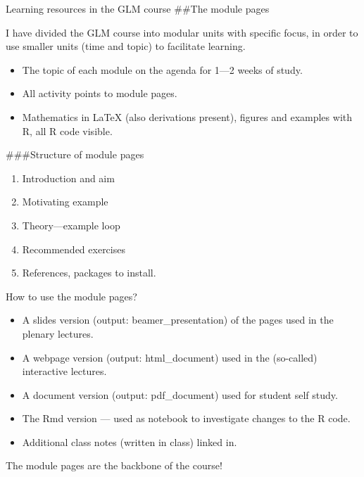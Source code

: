 \documentclass[
  ignorenonframetext,
]{beamer}
\providecommand{\tightlist}{%
  \setlength{\itemsep}{0pt}\setlength{\parskip}{0pt}}
\begin{document}
\begin{frame}{Learning resources in the GLM course}
\protect\hypertarget{learning-resources-in-the-glm-course}{}
\#\#The module pages

I have divided the GLM course into modular units with specific focus, in
order to use smaller units (time and topic) to facilitate learning.

\begin{itemize}
\tightlist
\item
  The topic of each module on the agenda for 1---2 weeks of study.
\item
  All activity points to module pages.
\item
  Mathematics in LaTeX (also derivations present), figures and examples
  with R, all R code visible.
\end{itemize}
\end{frame}

\begin{frame}
\#\#\#Structure of module pages

\begin{enumerate}
[1)]
\tightlist
\item
  Introduction and aim
\item
  Motivating example
\item
  Theory---example loop
\item
  Recommended exercises
\item
  References, packages to install.
\end{enumerate}
\end{frame}

\begin{frame}
\begin{block}{How to use the module pages?}
\protect\hypertarget{how-to-use-the-module-pages}{}
\begin{itemize}
\tightlist
\item
  A slides version (output: beamer\_presentation) of the pages used in
  the plenary lectures.
\item
  A webpage version (output: html\_document) used in the (so-called)
  interactive lectures.
\item
  A document version (output: pdf\_document) used for student self
  study.
\item
  The Rmd version --- used as notebook to investigate changes to the R
  code.
\item
  Additional class notes (written in class) linked in.
\end{itemize}

The module pages are the backbone of the course!
\end{block}
\end{frame}
\end{document}

